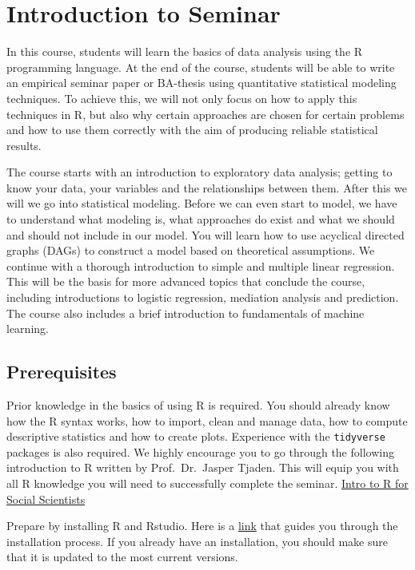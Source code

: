 \documentclass[
]{book}
\begin{document}
\hypertarget{intro-sem}{%
\chapter{Introduction to Seminar}\label{intro-sem}}

In this course, students will learn the basics of data analysis using the R programming language. At the end of the course, students will be able to write an empirical seminar paper or BA-thesis using quantitative statistical modeling techniques. To achieve this, we will not only focus on how to apply this techniques in R, but also why certain approaches are chosen for certain problems and how to use them correctly with the aim of producing reliable statistical results.

The course starts with an introduction to exploratory data analysis; getting to know your data, your variables and the relationships between them. After this we will we go into statistical modeling. Before we can even start to model, we have to understand what modeling is, what approaches do exist and what we should and should not include in our model. You will learn how to use acyclical directed graphs (DAGs) to construct a model based on theoretical assumptions. We continue with a thorough introduction to simple and multiple linear regression. This will be the basis for more advanced topics that conclude the course, including introductions to logistic regression, mediation analysis and prediction. The course also includes a brief introduction to fundamentals of machine learning.

\hypertarget{prerequisites}{%
\section{Prerequisites}\label{prerequisites}}

Prior knowledge in the basics of using R is required. You should already know how the R syntax works, how to import, clean and manage data, how to compute descriptive statistics and how to create plots. Experience with the \texttt{tidyverse} packages is also required.
We highly encourage you to go through the following introduction to R written by Prof.~Dr.~Jasper Tjaden. This will equip you with all R knowledge you will need to successfully complete the seminar.
\href{https://jaspertjaden.github.io/course-intro2r/}{Intro to R for Social Scientists}

Prepare by installing R and Rstudio. Here is a \href{https://rstudio-education.github.io/hopr/starting.html}{link} that guides you through the installation process. If you already have an installation, you should make sure that it is updated to the most current versions.
\end{document}
